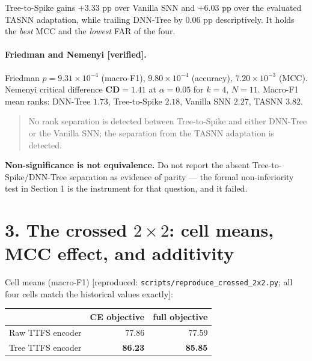 \noindent Tree-to-Spike gains $\mathbf{+3.33}$ pp over Vanilla SNN and $\mathbf{+6.03}$ pp
over the evaluated TASNN adaptation, while trailing DNN-Tree by $\mathbf{0.06}$ pp
descriptively. It holds the \emph{best} MCC and the \emph{lowest} FAR of the four.

\paragraph{Friedman and Nemenyi \textup{[verified]}.} Friedman
$p = 9.31\times10^{-4}$ (macro-F1), $9.80\times10^{-4}$ (accuracy),
$7.20\times10^{-3}$ (MCC). Nemenyi critical difference $\mathbf{CD = 1.41}$ at
$\alpha=0.05$ for $k=4$, $N=11$. Macro-F1 mean ranks: DNN-Tree $\mathbf{1.73}$,
Tree-to-Spike $\mathbf{2.18}$, Vanilla SNN $\mathbf{2.27}$, TASNN $\mathbf{3.82}$.

\begin{quote}
No rank separation is detected between Tree-to-Spike and either DNN-Tree or the Vanilla
SNN; the separation from the TASNN adaptation is detected.
\end{quote}

\noindent\textbf{Non-significance is not equivalence.} Do not report the absent
Tree-to-Spike/DNN-Tree separation as evidence of parity --- the formal
non-inferiority test in Section 1 is the instrument for that question, and it failed.

\section*{3. The crossed $2\times2$: cell means, MCC effect, and additivity}

Cell means (macro-F1) \textup{[reproduced: \texttt{scripts/reproduce\_crossed\_2x2.py}; all four cells match the historical values exactly]}:

\begin{center}\small
\begin{tabular}{lrr}\toprule
 & CE objective & full objective \\\midrule
Raw TTFS encoder  & 77.86 & 77.59 \\
Tree TTFS encoder & \textbf{86.23} & \textbf{85.85} \\
\bottomrule\end{tabular}\end{center}

